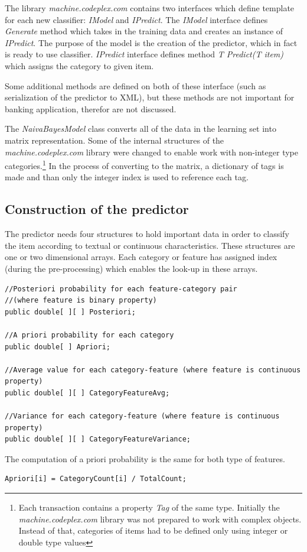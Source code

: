 The library \textit{machine.codeplex.com} contains two interfaces which define template for each new classifier: \textit{IModel} and \textit{IPredict}. The \textit{IModel} interface defines \textit{Generate} method which takes in the training data and creates an instance of \textit{IPredict}. The purpose of the model is the creation of the predictor, which in fact is ready to use classifier. \textit{IPredict} interface defines method \textit{T Predict(T item)} which assigns the category to given item.

Some additional methods are defined on both of these interface (such as serialization of the predictor to XML), but these methods are not important for banking application, therefor are not discussed.

The \textit{NaivaBayesModel} class converts all of the data in the learning set into matrix representation. Some of the internal structures of the \textit{machine.codeplex.com} library were changed to enable work with non-integer type categories.\footnote{Each transaction contains a property \textit{Tag} of the same type. Initially the \textit{machine.codeplex.com} library was not prepared to work with complex objects. Instead of that, categories of items had to be defined only using integer or double type values} In the process of converting to the matrix, a dictionary of tags is made and than only the integer index is used to reference each tag.

\subsection{Construction of the predictor}
The predictor needs four structures to hold important data in order to classify the item according to textual or continuous characteristics. These structures are one or two dimensional arrays. Each category or feature has assigned index (during the pre-processing) which enables the look-up in these arrays.

\begin{verbatim}
//Posteriori probability for each feature-category pair
//(where feature is binary property)
public double[ ][ ] Posteriori;

//A priori probability for each category
public double[ ] Apriori;

//Average value for each category-feature (where feature is continuous property)
public double[ ][ ] CategoryFeatureAvg;

//Variance for each category-feature (where feature is continuous property)
public double[ ][ ] CategoryFeatureVariance;
\end{verbatim}
The computation of a priori probability is the same for both type of features. 
\begin{verbatim}
Apriori[i] = CategoryCount[i] / TotalCount;
\end{verbatim}

